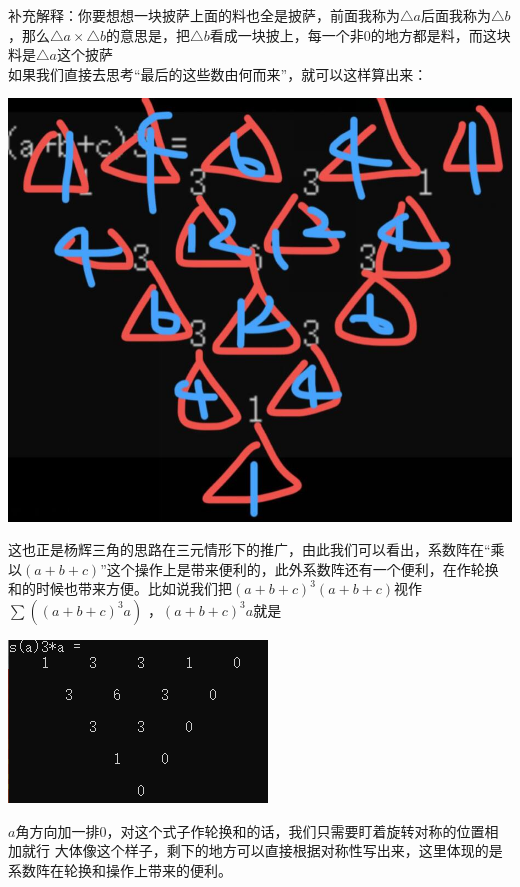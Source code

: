 \documentclass[UTF8]{ctexart}
\begin{document}
补充解释：你要想想一块披萨上面的料也全是披萨，前面我称为$ \triangle  a$后面我称为$\triangle b $，那么$ \triangle a×\triangle b $的意思是，把$\triangle b $看成一块披上，每一个非$ 0 $的地方都是料，而这块料是$ \triangle a $这个披萨\\
如果我们直接去思考“最后的这些数由何而来”，就可以这样算出来：
\begin{center}
	\includegraphics[width=0.27\linewidth]{07}
\end{center}
这也正是杨辉三角的思路在三元情形下的推广，由此我们可以看出，系数阵在“乘以$ (a+b+c) $”这个操作上是带来便利的，此外系数阵还有一个便利，在作轮换和的时候也带来方便。比如说我们把$ (a+b+c)^{3}(a+b+c) $视作$ \displaystyle \sum((a+b+c)^{3}a) $ ，$ (a+b+c)^{3}a $就是
\begin{center}
	\includegraphics[width=0.31\linewidth]{08}
\end{center}
$ a $角方向加一排$ 0 $，对这个式子作轮换和的话，我们只需要盯着旋转对称的位置相加就行
大体像这个样子，剩下的地方可以直接根据对称性写出来，这里体现的是系数阵在轮换和操作上带来的便利。
\end{document}
